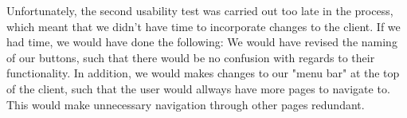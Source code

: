 Unfortunately, the second usability test was carried out too late in the process, which meant that we didn't have time to incorporate changes to the client. If we had time, we would have done the following: We would have revised the naming of our buttons, such that there would be no confusion with regards to their functionality. In addition, we would makes changes to our "menu bar" at the top of the client, such that the user would allways have more pages to navigate to. This would make unnecessary navigation through other pages redundant.
